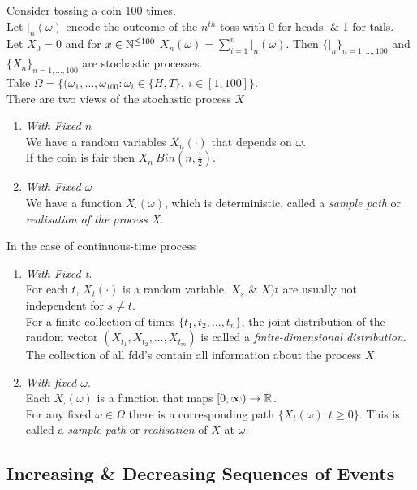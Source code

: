 \documentclass[11pt,a4paper]{article}
\begin{document}
Consider tossing a coin 100 times.\\
Let $|_n(\omega)$ encode the outcome of the $n^{th}$ toss with 0 for heads. \& 1 for tails.\\
Let $X_0=0$ and for $x\in\mathbb{N}^{\leq100}$ $X_n(\omega)=\sum_{i=1}^n|_n(\omega)$.
Then $\{|_n\}_{n=1,\dots,100}$ and $\{X_n\}_{n=1,\dots,100}$ are stochastic processes.\\
Take $\Omega=\{(\omega_1,\dots,\omega_{100}:\omega_i\in\{H,T\},\ i\in[1,100]\}$.\\
There are two views of the stochastic process $X$
\begin{enumerate}[label=\roman*)]
	\item \textit{With Fixed $n$}\\
			We have a random variables $X_n(\pmb{\cdot})$ that depends on $\omega$.\\
			If the coin is fair then $X_n~Bin(n,\frac{1}{2})$.
	\item \textit{With Fixed $\omega$}\\
			We have a function $X_{\pmb{\cdot}}(\omega)$, which is deterministic, called a \textit{sample path} or \textit{realisation of the process X}.
\end{enumerate}
In the case of continuous-time process
\begin{enumerate}[label=\roman*)]
	\item \textit{With Fixed t}.\\
			For each $t$, $X_t(\cdot)$ is a random variable. $X_s$ \& $X)t$ are usually not independent for $s\neq t$.\\
			For a finite collection of times $\{t_1,t_2,\dots,t_n\}$, the joint distribution of the random vector $(X_{t_1},X_{t_2},\dots,X_{t_m})$ is called a \textit{finite-dimensional distribution}.\\
			The collection of all fdd's contain all information about the process $X$.
	\item \textit{With fixed $\omega$}.\\
			Each $X_\cdot(\omega)$ is a function that maps $[0,\infty)\to\mathbb{R}$.\\
			For any fixed $\omega\in\Omega$ there is a corresponding path $\{X_t(\omega):t\geq0\}$. 			This is called a \textit{sample path} or \textit{realisation} of $X$ at $\omega$. 
\end{enumerate}

\subsection{Increasing \& Decreasing Sequences of Events}
\end{document}
